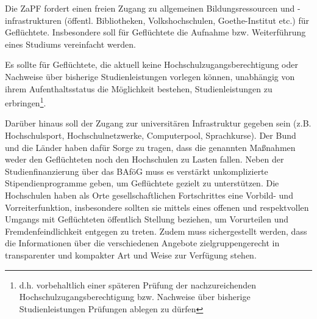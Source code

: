 Die ZaPF fordert einen freien Zugang zu allgemeinen Bildungsressourcen und -
infrastrukturen (öffentl. Bibliotheken, Volkshochschulen, Goethe-Institut etc.)
für Geflüchtete. Insbesondere soll für Geflüchtete die Aufnahme bzw.
Weiterführung eines Studiums vereinfacht werden. 

Es sollte für Geflüchtete, die aktuell keine  Hochschulzugangsberechtigung oder
Nachweise über bisherige Studienleistungen vorlegen können, unabhängig von
ihrem Aufenthaltsstatus die Möglichkeit bestehen, Studienleistungen zu
erbringen\footnote{d.h. vorbehaltlich einer späteren Prüfung der
	nachzureichenden Hochschulzugangsberechtigung bzw. Nachweise über bisherige
Studienleistungen Prüfungen ablegen zu dürfen}.

Darüber hinaus soll der Zugang zur universitären Infrastruktur gegeben sein
(z.B. Hochschulsport, Hochschulnetzwerke, Computerpool, Sprachkurse). Der Bund
und die Länder haben dafür Sorge zu tragen, dass die genannten Maßnahmen weder
den Geflüchteten noch den Hochschulen zu Lasten fallen. Neben der
Studienfinanzierung über das BAföG muss es verstärkt unkomplizierte
Stipendienprogramme geben, um Geflüchtete gezielt zu unterstützen. Die
Hochschulen haben als Orte gesellschaftlichen Fortschrittes eine Vorbild- und
Vorreiterfunktion, insbesondere sollten sie mittels eines offenen und
respektvollen Umgangs mit Geflüchteten öffentlich Stellung beziehen, um
Vorurteilen und Fremdenfeindlichkeit entgegen zu treten. Zudem muss
sichergestellt werden, dass die Informationen über die verschiedenen Angebote  %
zielgruppengerecht in transparenter und kompakter Art und Weise zur Verfügung
stehen.
